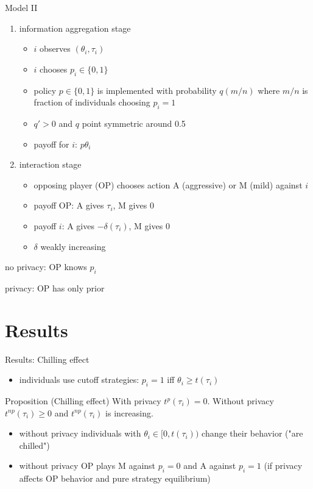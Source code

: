 \documentclass[bigger]{beamer}
\begin{document}
\begin{frame}[label={sec:org386ad2b}]{Model II}
\begin{enumerate}
\item information aggregation stage
\begin{itemize}
\item \(i\) observes \((\theta_i,\tau_i)\)
\item \(i\) chooses \(p_i\in\{0,1\}\)
\item policy \(p\in\{0,1\}\) is implemented with probability \(q(m/n)\) where \(m/n\) is fraction of individuals choosing \(p_i=1\)
\item \(q'>0\) and \(q\) point symmetric around 0.5
\item payoff for \(i\): \(p\theta_i\)
\end{itemize}
\item interaction stage
\begin{itemize}
\item opposing player (OP) chooses action A (aggressive) or M (mild) against \(i\)
\item payoff OP: A gives \(\tau_i\), M gives 0
\item payoff \(i\): A gives \(-\delta(\tau_i)\), M gives 0
\item \(\delta\) weakly increasing
\end{itemize}
\end{enumerate}

no privacy: OP knows \(p_i\)

privacy: OP has only prior
\end{frame}

\section{Results}
\label{sec:org783dea5}

\begin{frame}[label={sec:org5edcb1f}]{Results: Chilling effect}
\begin{itemize}
\item individuals use cutoff strategies: \(p_i=1\) iff \(\theta_i\geq t(\tau_i)\)
\end{itemize}

\begin{block}{Proposition (Chilling effect)}
With privacy \(t^p(\tau_i)=0\). \linebreak Without privacy \(t^{np}(\tau_i)\geq0\) and \(t^{np}(\tau_i)\) is increasing.
\end{block}

\begin{itemize}
\item without privacy individuals with \(\theta_i\in [0,t(\tau_i))\) change their behavior ("are chilled")
\item without privacy OP plays M against \(p_i=0\) and A against \(p_i=1\) \linebreak (if privacy affects OP behavior and pure strategy equilibrium)
\end{itemize}
\end{frame}
\end{document}
